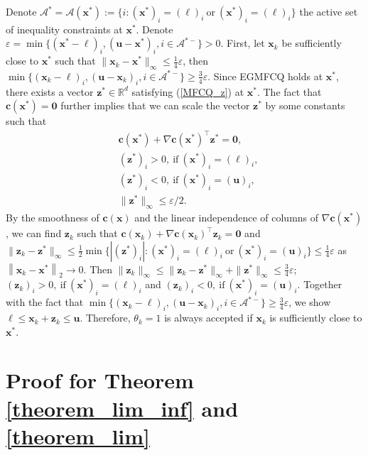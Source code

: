 \documentclass[aos]{imsart}
\numberwithin{equation}{section}
\theoremstyle{plain}
\begin{document}
\begin{appendix}
Denote $\mathcal{A}^{*} = \mathcal{A}(\bm{x}^{*}):= \{i: (\bm{x}^{*})_i = (\bm{\ell})_i~\text{or}~(\bm{x}^{*})_i = (\bm{\ell})_i\}$ the active set of inequality constraints at $\bm{x}^{*}$. Denote $\varepsilon = \min \{ (\bm{x}^{*}-\bm{\ell})_i, (\bm{u} - \bm{x}^{*})_i, i \in \mathcal{A}^{*-}\} > 0$. First, let $\bm{x}_k$ be sufficiently close to $\bm{x}^{*}$ such that $\|\bm{x}_k - \bm{x}^{*}\|_{\infty} \leq \frac{1}{4} \varepsilon$, then $\min \{ (\bm{x}_{k}-\bm{\ell})_i, (\bm{u} - \bm{x}_{k})_i, i \in \mathcal{A}^{*-}\} \geq \frac{3}{4}\varepsilon$. Since EGMFCQ holds at $\bm{x}^{*}$, there exists a vector $\bm{z}^{*} \in \mathbb{R}^{d}$ satisfying (\ref{MFCQ_z}) at $\bm{x}^{*}$. The fact that $\bm{c}(\bm{x}^{*}) = \bm{0}$ further implies that we can scale the vector $\bm{z}^{*}$ by some constants such that 
    \begin{equation*}
        \begin{split}
            & \bm{c}(\bm{x}^{*}) + \nabla \bm{c}(\bm{x}^{*})^{\top} \bm{z}^{*} = \bm{0},\\
            & (\bm{z}^{*})_i >0,~\text{if}~(\bm{x}^{*})_{i} = (\bm{\ell})_i,\\
            & (\bm{z}^{*})_i < 0,~\text{if}~(\bm{x}^{*})_{i} = (\bm{u})_i,\\
            & \|\bm{z}^{*}\|_{\infty} \leq \varepsilon/2.
        \end{split}
    \end{equation*}
    By the smoothness of $\bm{c}(\bm{x})$ and the linear independence of columns of $\nabla \bm{c}(\bm{x}^{*})$, we can find $\bm{z}_k$ such that $\bm{c}(\bm{x}_k) + \nabla \bm{c}(\bm{x}_k)^{\top} \bm{z}_k = \bm{0}$ and $\|\bm{z}_k - \bm{z}^{*}\|_{\infty} \leq \frac{1}{2} \min\{|(\bm{z}^{*})_{i}|:(\bm{x}^{*})_{i} = (\bm{\ell})_i ~\text{or}~ (\bm{x}^{*})_{i} = (\bm{u})_i \} \leq \frac{1}{4} \varepsilon$ as $\left\| \bm{x}_k - \bm{x}^{*} \right\|_2 \to 0$. Then $\|\bm{z}_k \|_{\infty} \leq \|\bm{z}_k - \bm{z}^{*}\|_{\infty} + \|\bm{z}^{*}\|_{\infty} \leq \frac{3}{4} \varepsilon$; $(\bm{z}_{k})_i >0,~\text{if}~(\bm{x}^{*})_{i} = (\bm{\ell})_i$ and $(\bm{z}_{k})_i < 0,~\text{if}~(\bm{x}^{*})_{i} = (\bm{u})_i$. Together with the fact that $\min \{ (\bm{x}_{k}-\bm{\ell})_i, (\bm{u} - \bm{x}_{k})_i, i \in \mathcal{A}^{*-}\} \geq \frac{3}{4}\varepsilon$, we show $\bm{\ell} \leq \bm{x}_k + \bm{z}_k  \leq \bm{u}$. Therefore, $\theta_k = 1$ is always accepted if $\bm{x}_k$ is sufficiently close to $\bm{x}^{*}$.


\newpage
\section{Proof for Theorem \ref{theorem_lim_inf} and \ref{theorem_lim}}


\end{appendix}
\end{document}
